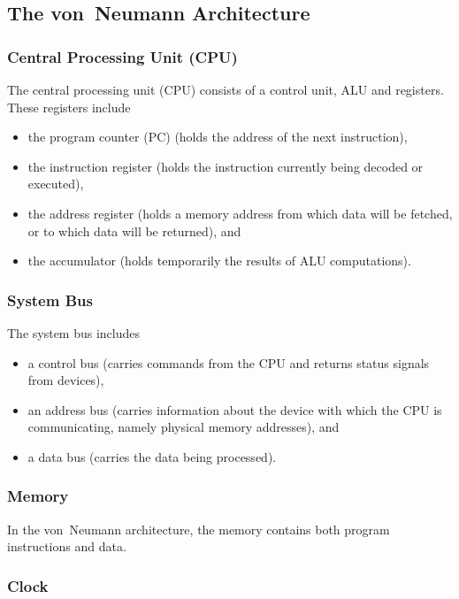 \subsection{The von~Neumann Architecture}

\subsubsection{Central Processing Unit (CPU)}

The central processing unit (CPU) consists of a control unit, ALU and registers.
These registers include
\begin{itemize}
  \item the program counter (PC) (holds the address of the next instruction),
  \item the instruction register (holds the instruction currently being decoded or executed),
  \item the address register (holds a memory address from which data will be fetched, or to which data will be returned), and
  \item the accumulator (holds temporarily the results of ALU computations).
\end{itemize}

\subsubsection{System Bus}

The system bus includes
\begin{itemize}
  \item a control bus (carries commands from the CPU and returns status signals from devices),
  \item an address bus (carries information about the device with which the CPU is communicating, namely physical memory addresses), and
  \item a data bus (carries the data being processed).
\end{itemize}

\subsubsection{Memory}

In the von~Neumann architecture, the memory contains both program instructions and data.

\subsubsection{Clock}

